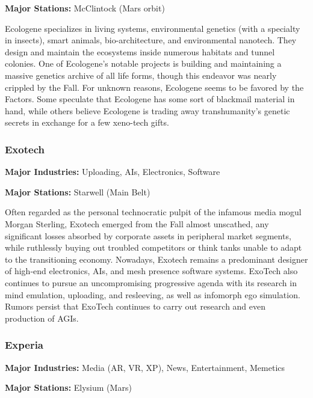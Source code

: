 \textbf{Major Stations:} McClintock (Mars orbit) 

Ecologene specializes in living systems, environmental genetics (with a specialty in insects), smart animals, bio-architecture, and environmental nanotech. They design and maintain the ecosystems inside numerous habitats and tunnel colonies. One of Ecologene's notable projects is building and maintaining a massive genetics archive of all life forms, though this endeavor was nearly crippled by the Fall. For unknown reasons, Ecologene seems to be favored by the Factors. Some speculate that Ecologene has some sort of blackmail material in hand, while others believe Ecologene is trading away transhumanity's genetic secrets in exchange for a few xeno-tech gifts. 

\subsubsection{Exotech} \label{sec:exotech} 

\textbf{Major Industries:} Uploading, AIs, Electronics, Software 

\textbf{Major Stations:} Starwell (Main Belt) 

Often regarded as the personal technocratic pulpit of the infamous media mogul Morgan Sterling, Exotech emerged from the Fall almost unscathed, any significant losses absorbed by corporate assets in peripheral market segments, while ruthlessly buying out troubled competitors or think tanks unable to adapt to the transitioning economy. Nowadays, Exotech remains a predominant designer of high-end electronics, AIs, and mesh presence software systems. ExoTech also continues to pursue an uncompromising progressive agenda with its research in mind emulation, uploading, and resleeving, as well as infomorph ego simulation. Rumors persist that ExoTech continues to carry out research and even production of AGIs. 

\subsubsection{Experia} \label{sec:experia} 

\textbf{Major Industries:} Media (AR, VR, XP), News, Entertainment, Memetics 

\textbf{Major Stations:} Elysium (Mars) 


